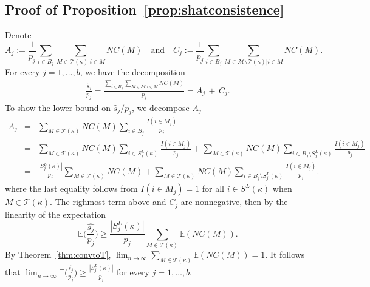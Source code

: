\documentclass[bj,authoryear]{imsart}
\theoremstyle{plain}
\newcommand{\E}{\mathbb{E}}
\newcommand{\M}{\mathcal{M}}
\newcommand{\T}{\mathcal{T}}
\begin{document}
\subsection{Proof of Proposition~\ref{prop:shatconsistence}}
Denote
$$A_j:=\frac{1}{p_j}\sum_{i \in B_j}\sum_{M \in \T(\kappa)|i\in M}NC(M) \quad\text{and}\quad  C_j:=\frac{1}{p_j}\sum_{i \in B_j}\sum_{M \in \M\setminus \T(\kappa)|i\in M}NC(M).$$
For every $j=1,\ldots,b$, we have the decomposition
\begin{gather}\label{eq:decompshat}
    \frac{\hat{s}_j}{p_j}
    =\frac{\sum_{i \in B_j} \sum_{M \in \M | i \in M} NC(M)}{p_j}
   =A_j\,+\, C_j.
\end{gather}
To show the lower bound on $\hat{s}_j/p_j$, we decompose $A_j$
\begin{eqnarray}
  A_j
   &=& \sum_{M \in \T(\kappa)}NC(M)\sum_{i \in B_j}\frac{I(i\in M_j)}{p_j}\nonumber\\
   &=& \sum_{M \in \T(\kappa)}NC(M)\sum_{i \in S^{L}_j(\kappa)}\frac{I(i\in M_j)}{p_j}+\sum_{M \in \T(\kappa)}NC(M)\sum_{i \in B_j\setminus S^{L}_j(\kappa)}\frac{I(i\in M_j)}{p_j}\nonumber\\
   &=& \frac{|S^{L}_j(\kappa)|}{p_j}\sum_{M \in \T(\kappa)}NC(M)+\sum_{M \in \T(\kappa)}NC(M)\sum_{i \in B_j\setminus S^{L}_j(\kappa)}\frac{I(i\in M_j)}{p_j}\label{eq:wigr}.
\end{eqnarray}
where the last equality follows from $I(i\in M_j)=1$ for all $i\in S^L(\kappa)$ when $M\in\T(\kappa)$. The righmost term above and $C_j$ are nonnegative, then by the linearity of the expectation
$$\E\Big(\frac{\widehat{s_j}}{p_j}\Big)\geq\frac{|S^{L}_j(\kappa)|}{p_j}\sum_{M \in \T(\kappa)}\E(NC(M)).$$
By Theorem~\ref{thm:convtoT}, $\lim_{n\to\infty}\sum_{M \in \T(\kappa)}\E(NC(M))=1$. It follows that $\lim_{n\to\infty}\E\Big(\frac{\widehat{s_j}}{p_j}\Big)\geq \frac{|S^{L}_j(\kappa)|}{p_j}$ for every $j=1,\ldots,b$.
\end{document}

